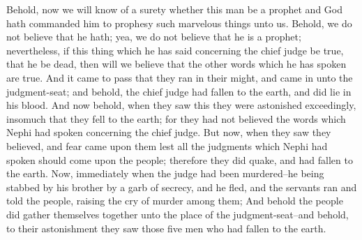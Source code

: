 Behold, now we will know of a surety whether this man be a prophet and God hath commanded him to prophesy such marvelous things unto us. Behold, we do not believe that he hath; yea, we do not believe that he is a prophet; nevertheless, if this thing which he has said concerning the chief judge be true, that he be dead, then will we believe that the other words which he has spoken are true.
\bverse \iffalse And it came to pass that they ran in their might, and came in unto the judgment-seat; and behold, the chief judge had fallen to the earth, and did lie in his blood. \fi
And it came to pass that they ran in their might, and came in unto the judgment-seat; and behold, the chief judge had fallen to the earth, and did lie in his blood.
\bverse \iffalse And now behold, when they saw this they were astonished exceedingly, insomuch that they fell to the earth; for they had not believed the words which Nephi had spoken concerning the chief judge. \fi
And now behold, when they saw this they were astonished exceedingly, insomuch that they fell to the earth; for they had not believed the words which Nephi had spoken concerning the chief judge.
\bverse \iffalse But now, when they saw they believed, and fear came upon them lest all the judgments which Nephi had spoken should come upon the people; therefore they did quake, and had fallen to the earth. \fi
But now, when they saw they believed, and fear came upon them lest all the judgments which Nephi had spoken should come upon the people; therefore they did quake, and had fallen to the earth.
\bverse \iffalse Now, immediately when the judge had been murdered--he being stabbed by his brother by a garb of secrecy, and he fled, and the servants ran and told the people, raising the cry of murder among them; \fi
Now, immediately when the judge had been murdered--he being stabbed by his brother by a garb of secrecy, and he fled, and the servants ran and told the people, raising the cry of murder among them;
\bverse \iffalse And behold the people did gather themselves together unto the place of the judgment-seat--and behold, to their astonishment they saw those five men who had fallen to the earth. \fi
And behold the people did gather themselves together unto the place of the judgment-seat--and behold, to their astonishment they saw those five men who had fallen to the earth.
\bverse \iffalse And now behold, the people knew nothing concerning the multitude who had gathered together at the garden of Nephi; therefore they said among themselves: These men are they who have murdered the judge, and God has smitten them that they could not flee from us. \fi
